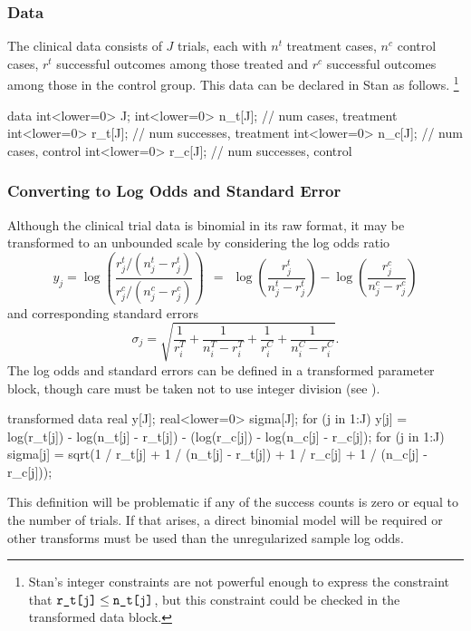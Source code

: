 \subsubsection{Data}

The clinical data consists of $J$ trials, each with $n^t$ treatment
cases, $n^c$ control cases, $r^t$ successful outcomes among those treated and
$r^c$ successful outcomes among those in the control group.  This data
can be declared in Stan as follows.%
%
\footnote{Stan's integer constraints are not powerful enough to express the
constraint that $\mbox{{\tt r\_t[j]}} \leq \mbox{{\tt n\_t[j]}}$,
but this constraint could be checked in the transformed data block.}
%
\begin{stancode}
data {
  int<lower=0> J;
  int<lower=0> n_t[J];  // num cases, treatment
  int<lower=0> r_t[J];  // num successes, treatment
  int<lower=0> n_c[J];  // num cases, control
  int<lower=0> r_c[J];  // num successes, control
}
\end{stancode}
%

\subsubsection{Converting to Log Odds and Standard Error}

Although the clinical trial data is binomial in its raw format, it may
be transformed to an unbounded scale by considering the log odds ratio
\[
y_j = \log \left( \frac{r^t_j / (n^t_j - r^t_j)}
                       {r^c_j / (n^c_j - r^c_j)} \right)
\ \ = \ \
\log \left( \frac{r^t_j}{n^t_j - r^t_j} \right)
-
\log \left( \frac{r^c_j}{n^c_j - r^c_j} \right)
\]
and corresponding standard errors
\[
\sigma_j = \sqrt{
\frac{1}{r^T_i}
+ \frac{1}{n^T_i - r^T_i}
+ \frac{1}{r^C_i}
+ \frac{1}{n^C_i - r^C_i}
}.
\]
%
The log odds and standard errors can be defined in a
transformed parameter block, though care must be taken not to use
integer division (see \refsection{int-arithmetic}).
%
\begin{stancode}
transformed data {
  real y[J];
  real<lower=0> sigma[J];
  for (j in 1:J)
    y[j] = log(r_t[j]) - log(n_t[j] - r_t[j])
            - (log(r_c[j]) - log(n_c[j] - r_c[j]);
  for (j in 1:J)
    sigma[j] = sqrt(1 / r_t[j] + 1 / (n_t[j] - r_t[j])
                     + 1 / r_c[j] + 1 / (n_c[j] - r_c[j]));
}
\end{stancode}
%
This definition will be problematic if any of the success counts is
zero or equal to the number of trials.
If that arises, a direct binomial model will be required or other
transforms must be used than the unregularized sample log odds.

